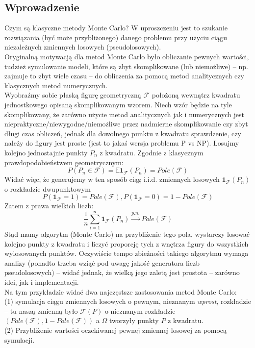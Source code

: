 \documentclass[a4paper]{article}
\theoremstyle{defn}
\theoremstyle{theorem}
\theoremstyle{lemma}
\theoremstyle{cor}
\theoremstyle{fact}
\begin{document}
\subsection{Wprowadzenie}
Czym są klasyczne metody Monte Carlo? W uproszczeniu jest to szukanie rozwiązania (być może przybliżonego) danego problemu przy użyciu ciągu niezależnych zmiennych losowych (pseudolosowych).\\
Oryginalną motywacją dla metod Monte Carlo było obliczanie pewnych wartości, tudzież symulowanie modeli, które są zbyt skomplikowane (lub niemożliwe) – np. zajmuje to zbyt wiele czasu  – do obliczenia za pomocą metod analitycznych czy klasycznych metod numerycznych.
\\

Wyobraźmy sobie płaską figurę geometryczną $\mathcal{F}$ położoną wewnątrz kwadratu jednostkowego opisaną skomplikowanym wzorem.
Niech wzór będzie na tyle skomplikowany, że zarówno użycie metod analitycznych jak i numerycznych jest niepraktyczne/niewygodne/niemożliwe przez nadmierne skomplikowanie czy zbyt długi czas obliczeń, jednak dla dowolnego punktu z kwadratu sprawdzenie, czy należy do figury jest proste (jest to jakaś wersja problemu P vs NP). Losujmy kolejno jednostajnie punkty $P_n$ z kwadratu. Zgodnie z klasycznym prawdopodobieństwem geometrycznym: $$P(P_n \in \mathcal{F}) = \mathbb{E}\mathbf{1}_{\mathcal{F}}(P_n) = Pole(\mathcal{F})$$
Widać więc, że generujemy w ten sposób ciąg i.i.d. zmiennych losowych $\mathbf{1}_{\mathcal{F}}(P_n)$ o rozkładzie dwupunktowym $$P(\mathbf{1}_{\mathcal{F}} = 1) = Pole(\mathcal{F}), P(\mathbf{1}_{\mathcal{F}} = 0) = 1 - Pole(\mathcal{F})$$
Zatem z prawa wielkich liczb:
$$\frac{1}{n} \sum\limits_{i=1}^n \mathbf{1}_{\mathcal{F}}(P_n) \overset{p.n.}{\to} Pole(\mathcal{F})$$
Stąd mamy algorytm (Monte Carlo) na przybliżenie tego pola, wystarczy losować kolejno punkty z kwadratu i liczyć proporcję tych z wnętrza figury do wszystkich wylosowanych punktów. Oczywiście tempo zbieżności takiego algorytmu wymaga analizy (ponadto trzeba wziąć pod uwagę jakość generatora liczb pseudolosowych) – widać jednak, że wielką jego zaletą jest prostota – zarówno idei, jak i implementacji.
\\

Na tym przykładzie widać dwa najczęstsze zastosowania metod Monte Carlo:\\
(1) symulacja ciągu zmiennych losowych o pewnym, nieznanym \textit{wprost}, rozkładzie – tu naszą zmienną było $\mathcal{F}(P)$ o nieznanym rozkładzie $(Pole(\mathcal{F}), 1 - Pole(\mathcal{F}))$ a $\Omega$ tworzyły punkty $P$ z kwadratu.\\
(2) Przybliżenie wartości oczekiwanej pewnej zmiennej losowej za pomocą symulacji.
\\
\end{document}
